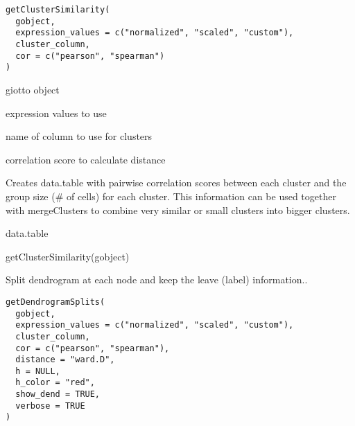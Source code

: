 \documentclass[a4paper]{book}
\begin{document}
%
\begin{Usage}
\begin{verbatim}
getClusterSimilarity(
  gobject,
  expression_values = c("normalized", "scaled", "custom"),
  cluster_column,
  cor = c("pearson", "spearman")
)
\end{verbatim}
\end{Usage}
%
\begin{Arguments}
\begin{ldescription}
\item[\code{gobject}] giotto object

\item[\code{expression\_values}] expression values to use

\item[\code{cluster\_column}] name of column to use for clusters

\item[\code{cor}] correlation score to calculate distance
\end{ldescription}
\end{Arguments}
%
\begin{Details}\relax
Creates data.table with pairwise correlation scores between each cluster and
the group size (\# of cells) for each cluster. This information can be used together
with mergeClusters to combine very similar or small clusters into bigger clusters.
\end{Details}
%
\begin{Value}
data.table
\end{Value}
%
\begin{Examples}
\begin{ExampleCode}
    getClusterSimilarity(gobject)
\end{ExampleCode}
\end{Examples}
%
\begin{Description}\relax
Split dendrogram at each node and keep the leave (label) information..
\end{Description}
%
\begin{Usage}
\begin{verbatim}
getDendrogramSplits(
  gobject,
  expression_values = c("normalized", "scaled", "custom"),
  cluster_column,
  cor = c("pearson", "spearman"),
  distance = "ward.D",
  h = NULL,
  h_color = "red",
  show_dend = TRUE,
  verbose = TRUE
)
\end{verbatim}
\end{Usage}
%
\end{document}
